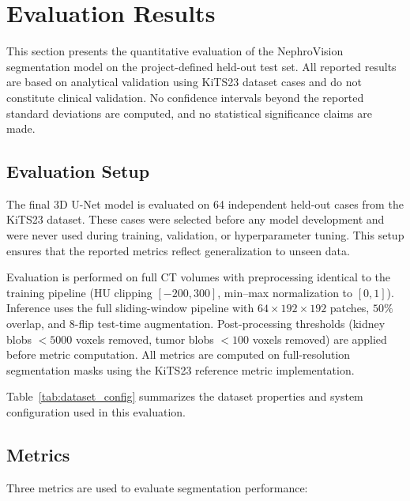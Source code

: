 \section{Evaluation Results}

This section presents the quantitative evaluation of the NephroVision segmentation model on the project-defined held-out test set. All reported results are based on analytical validation using KiTS23 dataset cases and do not constitute clinical validation. No confidence intervals beyond the reported standard deviations are computed, and no statistical significance claims are made.

\subsection{Evaluation Setup}

The final 3D U-Net model is evaluated on 64 independent held-out cases from the KiTS23 dataset. These cases were selected before any model development and were never used during training, validation, or hyperparameter tuning. This setup ensures that the reported metrics reflect generalization to unseen data.

Evaluation is performed on full CT volumes with preprocessing identical to the training pipeline (HU clipping $[-200, 300]$, min--max normalization to $[0, 1]$). Inference uses the full sliding-window pipeline with $64 \times 192 \times 192$ patches, $50\%$ overlap, and 8-flip test-time augmentation. Post-processing thresholds (kidney blobs $< 5000$ voxels removed, tumor blobs $< 100$ voxels removed) are applied before metric computation. All metrics are computed on full-resolution segmentation masks using the KiTS23 reference metric implementation.



Table~\ref{tab:dataset_config} summarizes the dataset properties and system configuration used in this evaluation.

\subsection{Metrics}

Three metrics are used to evaluate segmentation performance:

